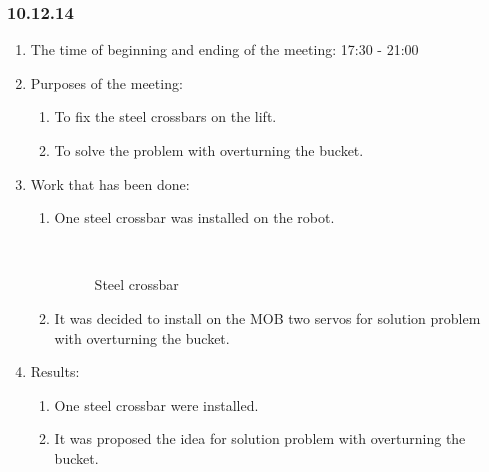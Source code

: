 \subsubsection{10.12.14}

\begin{enumerate}
	\item The time of beginning and ending of the meeting:
	17:30 - 21:00
	\item Purposes of the meeting:
	\begin{enumerate}
	  \item To fix the steel crossbars on the lift.
	  
	  \item To solve the problem with overturning the bucket.
	  
    \end{enumerate}
	\item Work that has been done:
	\begin{enumerate}
	  \item One steel crossbar was installed on the robot.
	  
	  \begin{figure}[H]
	  	\begin{minipage}[h]{0.2\linewidth}
	  		\center  
	  	\end{minipage}
	  	\begin{minipage}[h]{0.6\linewidth}
	  		\caption{Steel crossbar}
	  	\end{minipage}
	  \end{figure}
	  
	  \item It was decided to install on the MOB two servos for  solution problem with overturning the bucket.
	  
    \end{enumerate}
    
	\item Results: 
	\begin{enumerate}
	  \item One steel crossbar were installed.
	  
	  \item It was proposed the idea for solution problem with overturning the bucket.
	  

\end{enumerate}
\end{enumerate}
